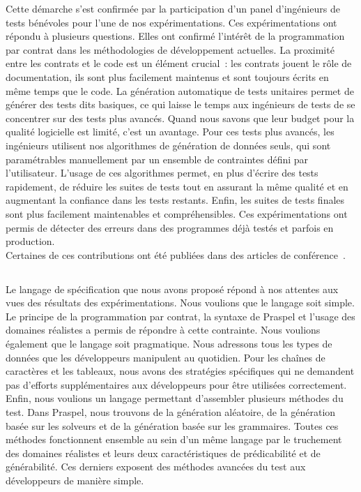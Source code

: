 Cette démarche s'est confirmée par la participation d'un panel d'ingénieurs de
tests bénévoles pour l'une de nos expérimentations. Ces expérimentations ont
répondu à plusieurs questions. Elles ont confirmé l'intérêt de la programmation
par contrat dans les méthodologies de développement actuelles. La proximité
entre les contrats et le code est un élément crucial~: les contrats jouent le
rôle de documentation, ils sont plus facilement maintenus et sont toujours
écrits en même temps que le code. La génération automatique de tests unitaires
permet de générer des tests dits basiques, ce qui laisse le temps aux ingénieurs
de tests de se concentrer sur des tests plus avancés. Quand nous savons que leur
budget pour la qualité logicielle est limité, c'est un avantage. Pour ces tests
plus avancés, les ingénieurs utilisent nos algorithmes de génération de données
seuls, qui sont paramétrables manuellement par un ensemble de contraintes défini
par l'utilisateur. L'usage de ces algorithmes permet, en plus d'écrire des tests
rapidement, de réduire les suites de tests tout en assurant la même qualité et
en augmentant la confiance dans les tests restants. Enfin, les suites de tests
finales sont plus facilement maintenables et compréhensibles. Ces
expérimentations ont permis de détecter des erreurs dans des programmes déjà
testés et parfois en production.  \\

Certaines de ces contributions ont été publiées dans des articles de
conférence~.

\subsection{}
\label{subsection:conclusions:summa}

Le langage de spécification que nous avons proposé répond à nos attentes aux
vues des résultats des expérimentations. Nous voulions que le langage soit
simple. Le principe de la programmation par contrat, la syntaxe de Praspel et
l'usage des domaines réalistes a permis de répondre à cette contrainte. Nous
voulions également que le langage soit pragmatique. Nous adressons tous les
types de données que les développeurs manipulent au quotidien. Pour les chaînes
de caractères et les tableaux, nous avons des stratégies spécifiques qui ne
demandent pas d'efforts supplémentaires aux développeurs pour être utilisées
correctement. Enfin, nous voulions un langage permettant d'assembler plusieurs
méthodes du test. Dans Praspel, nous trouvons de la génération aléatoire, de la
génération basée sur les solveurs et de la génération basée sur les grammaires.
Toutes ces méthodes fonctionnent ensemble au sein d'un même langage par le
truchement des domaines réalistes et leurs deux caractéristiques de
prédicabilité et de générabilité.  Ces derniers exposent des méthodes avancées
du test aux développeurs de manière simple.

